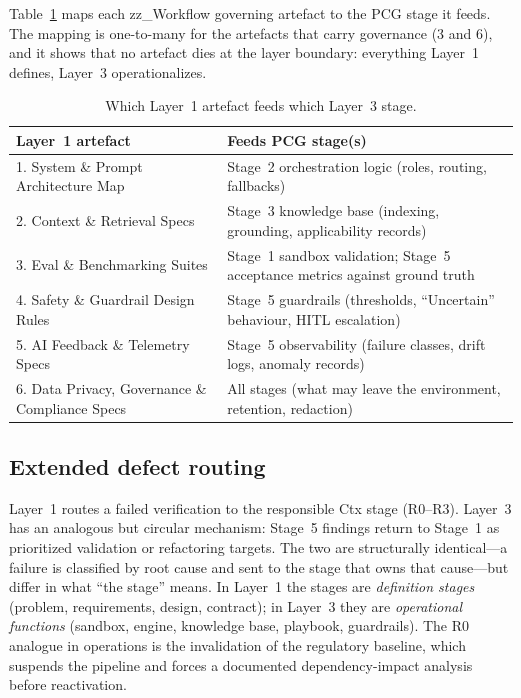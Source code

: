 \documentclass[11pt,a4paper]{article}
\begin{document}
Table~\ref{tab:mapping} maps each zz\_Workflow governing artefact to the PCG stage it feeds. The
mapping is one-to-many for the artefacts that carry governance (3 and 6), and it shows that no
artefact dies at the layer boundary: everything Layer~1 defines, Layer~3 operationalizes.

\begin{table}[htbp]
\centering
\caption{Which Layer~1 artefact feeds which Layer~3 stage.}
\label{tab:mapping}
\small
\begin{tabular}{@{}lp{9.6cm}@{}}
\toprule
\textbf{Layer~1 artefact} & \textbf{Feeds PCG stage(s)} \\
\midrule
1. System \& Prompt Architecture Map & Stage~2 orchestration logic (roles, routing, fallbacks) \\
2. Context \& Retrieval Specs & Stage~3 knowledge base (indexing, grounding, applicability records) \\
3. Eval \& Benchmarking Suites & Stage~1 sandbox validation; Stage~5 acceptance metrics against ground truth \\
4. Safety \& Guardrail Design Rules & Stage~5 guardrails (thresholds, ``Uncertain'' behaviour, HITL escalation) \\
5. AI Feedback \& Telemetry Specs & Stage~5 observability (failure classes, drift logs, anomaly records) \\
6. Data Privacy, Governance \& Compliance Specs & All stages (what may leave the environment, retention, redaction) \\
\bottomrule
\end{tabular}
\end{table}

\subsection{Extended defect routing}
\label{sec:extended}

Layer~1 routes a failed verification to the responsible Ctx stage (R0--R3). Layer~3 has an
analogous but circular mechanism: Stage~5 findings return to Stage~1 as prioritized validation
or refactoring targets. The two are structurally identical---a failure is classified by root
cause and sent to the stage that owns that cause---but differ in what ``the stage'' means. In
Layer~1 the stages are \emph{definition stages} (problem, requirements, design, contract); in
Layer~3 they are \emph{operational functions} (sandbox, engine, knowledge base, playbook,
guardrails). The R0 analogue in operations is the invalidation of the regulatory baseline, which
suspends the pipeline and forces a documented dependency-impact analysis before reactivation.
\end{document}
